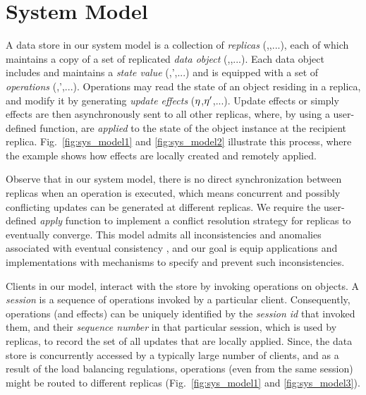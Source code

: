 \section{System Model}
\label{sec:sys_model}

A data store in our system model is a collection of \emph{replicas}
(,,...), each of which maintains a copy of a set of
replicated \emph{data object} (\xO,\yO,...).  Each data object includes
and maintains a \emph{state value} (\vO,\vO',...) and is equipped with a set of \emph{operations}
(\opO,\opO',...). Operations may read the state of an object
residing in a replica, and modify it by generating \emph{update
effects} ($\eta$,$\eta'$,...).
Update effects
or simply effects are then asynchronously sent to all other replicas, where,
by using a
user-defined function, are \emph{applied} to the state of the object
instance at the recipient replica. 
Fig.~\ref{fig:sys_model1} and \ref{fig:sys_model2} illustrate this
process, where the example shows how effects are locally created and
remotely applied. 

Observe that in our system model, there is no direct synchronization between replicas when an
operation is executed, which means concurrent and possibly conflicting
updates can be generated at different replicas. We
require the user-defined \emph{apply} function to implement a conflict
resolution strategy for replicas to eventually converge. 
This model admits all inconsistencies and anomalies
associated with eventual consistency \cite{quelea,terry}, and our goal is equip
applications and implementations with mechanisms to specify and prevent
such inconsistencies. 

Clients in our model, interact with the store by invoking operations on objects.
A \emph{session} is a sequence of operations invoked by a particular
client. Consequently, operations (and effects) can be uniquely
identified by the \emph{session id} that invoked them, and
their \emph{sequence number} in that particular session, which is used
by replicas, to record the set of all updates that are locally applied.
Since, the data
store is concurrently accessed by a typically large number of clients,
and as a result of the load balancing regulations,
operations (even from the same session) might be routed to different
replicas (Fig.~\ref{fig:sys_model1} and
\ref{fig:sys_model3}). 


